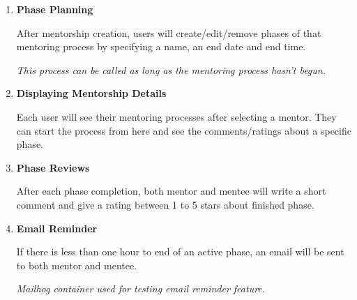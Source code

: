 \documentclass[10pt]{article}
\begin{document}
\begin{enumerate}
\item \textbf{Phase Planning}

After mentorship creation, users will create/edit/remove phases of that mentoring process by
specifying a name, an end date and end time.

\textit{This process can be called as long as the mentoring process hasn't begun.}


\item \textbf{Displaying Mentorship Details}

Each user will see their mentoring processes after selecting a mentor. They can start the
process from here and see the comments/ratings about a specific phase.


\item \textbf{Phase Reviews}

After each phase completion, both mentor and mentee will write a short comment and give a
rating between 1 to 5 stars about finished phase.


\item \textbf{Email Reminder}

If there is less than one hour to end of an active phase, an email will be sent to both
mentor and mentee.

\textit{Mailhog container used for testing email reminder feature.}

\end{enumerate}
\newpage
\end{document}
